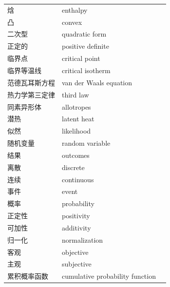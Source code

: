 \begin{xltabular}{\textwidth}{@{}l l c@{}}
  焓 & {\glossaryfont enthalpy} & \pageref{term:1.enthalpy} \\
  凸 & {\glossaryfont convex} & \pageref{term:1.convex} \\
  二次型 & {\glossaryfont quadratic form} & \pageref{term:1.quadratic-form} \\
  正定的 & {\glossaryfont positive definite} & \pageref{term:1.pos-def} \\
  临界点 & {\glossaryfont critical point} & \pageref{term:1.critical-point} \\
  临界等温线 & {\glossaryfont critical isotherm} & \pageref{term:1.critical-isotherm} \\
  范德瓦耳斯方程 & {\glossaryfont van der Waals equation} & \pageref{term:1.van-der-waals-eq} \\
  热力学第三定律 & {\glossaryfont third law} & \pageref{term:1.third-law} \\
  同素异形体 & {\glossaryfont allotropes} & \pageref{term:1.allotrope} \\
  潜热 & {\glossaryfont latent heat} & \pageref{term:1.latent-heat} \\
  似然 & {\glossaryfont likelihood} & \pageref{term:2.likelihood} \\
  随机变量 & {\glossaryfont random variable} & \pageref{term:2.random-var} \\
  结果 & {\glossaryfont outcomes} & \pageref{term:2.outcomes} \\
  离散 & {\glossaryfont discrete} & \pageref{term:2.discrete} \\
  连续 & {\glossaryfont continuous} & \pageref{term:2.continuous} \\
  事件 & {\glossaryfont event} & \pageref{term:2.event} \\
  概率 & {\glossaryfont probability} & \pageref{term:2.probability} \\
  正定性 & {\glossaryfont positivity} & \pageref{term:2.positivity} \\
  可加性 & {\glossaryfont additivity} & \pageref{term:2.additivity} \\
  归一化 & {\glossaryfont normalization} & \pageref{term:2.normalization} \\
  客观 & {\glossaryfont objective} & \pageref{term:2.objective} \\
  主观 & {\glossaryfont subjective} & \pageref{term:2.subjective} \\
  累积概率函数 & {\glossaryfont cumulative probability function} & \pageref{term:2.cpf} \\

\end{xltabular}
